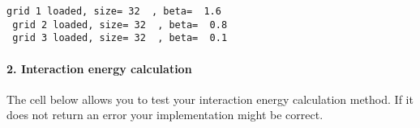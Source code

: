 \documentclass[11pt]{article}
\begin{document}
    \begin{Verbatim}[commandchars=\\\{\}]
 grid 1 loaded, size= 32  , beta=  1.6
 grid 2 loaded, size= 32  , beta=  0.8
 grid 3 loaded, size= 32  , beta=  0.1

    \end{Verbatim}

    \hypertarget{interaction-energy-calculation}{%
\paragraph{2. Interaction energy
calculation}\label{interaction-energy-calculation}}

The cell below allows you to test your interaction energy calculation
method. If it does not return an error your implementation might be
correct.
\end{document}
